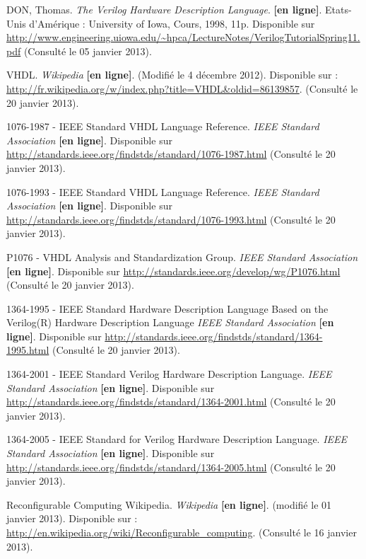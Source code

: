 \documentclass{report}
\begin{document}
\begin{thebibliography}{1}
DON, Thomas. \textit{The Verilog Hardware Description Language}. \textbf{[en ligne]}. Etats-Unis d'Amérique : University of Iowa, Cours, 1998, 11p. Disponible sur \url{http://www.engineering.uiowa.edu/~hpca/LectureNotes/VerilogTutorialSpring11.pdf} (Consulté le 05 janvier 2013).

VHDL. \textit{Wikipedia} \textbf{[en ligne]}. (Modifié le 4 décembre 2012). Disponible sur : \url{http://fr.wikipedia.org/w/index.php?title=VHDL\&oldid=86139857}. (Consulté le 20 janvier 2013).

1076-1987 - IEEE Standard VHDL Language Reference. \textit{IEEE Standard Association} \textbf{[en ligne]}. Disponible sur \url{http://standards.ieee.org/findstds/standard/1076-1987.html} (Consulté le 20 janvier 2013).

1076-1993 - IEEE Standard VHDL Language Reference. \textit{IEEE Standard Association} \textbf{[en ligne]}. Disponible sur \url{http://standards.ieee.org/findstds/standard/1076-1993.html} (Consulté le 20 janvier 2013).

P1076 - VHDL Analysis and Standardization Group. \textit{IEEE Standard Association} \textbf{[en ligne]}. Disponible sur \url{http://standards.ieee.org/develop/wg/P1076.html} (Consulté le 20 janvier 2013).

1364-1995 - IEEE Standard Hardware Description Language Based on the Verilog(R) Hardware Description Language \textit{IEEE Standard Association} \textbf{[en ligne]}. Disponible sur \url{http://standards.ieee.org/findstds/standard/1364-1995.html} (Consulté le 20 janvier 2013).

1364-2001 - IEEE Standard Verilog Hardware Description Language. \textit{IEEE Standard Association} \textbf{[en ligne]}. Disponible sur \url{http://standards.ieee.org/findstds/standard/1364-2001.html} (Consulté le 20 janvier 2013).

1364-2005 - IEEE Standard for Verilog Hardware Description Language. \textit{IEEE Standard Association} \textbf{[en ligne]}. Disponible sur \url{http://standards.ieee.org/findstds/standard/1364-2005.html} (Consulté le 20 janvier 2013).

Reconfigurable Computing Wikipedia. \textit{Wikipedia} \textbf{[en ligne]}. (modifié le 01 janvier 2013). Disponible sur : \url{http://en.wikipedia.org/wiki/Reconfigurable\_computing}. (Consulté le 16 janvier 2013).


\end{thebibliography}
\end{document}
